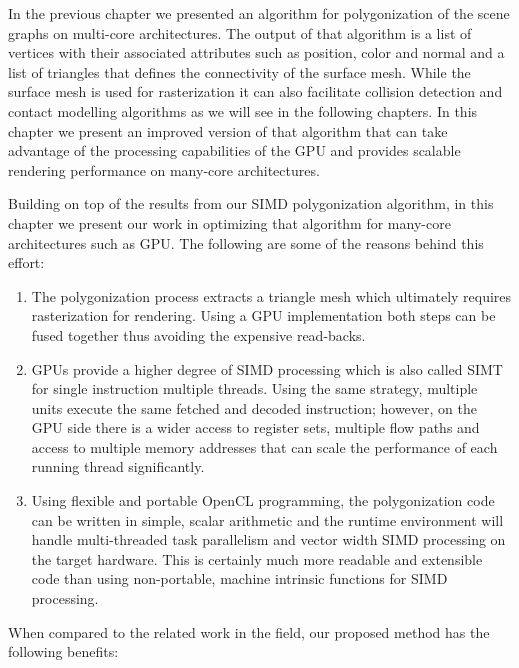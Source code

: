 \label{chapter:GPUDiscretization}
In the previous chapter we presented an algorithm for polygonization of the \blob scene graphs on 
multi-core architectures. The output of that algorithm is a list of vertices with their associated attributes 
such as position, color and normal and a list of triangles that defines the connectivity of the surface mesh. 
While the surface mesh is used for rasterization it can also facilitate collision detection and contact 
modelling algorithms as we will see in the following chapters.  In this chapter we present an improved 
version of that algorithm that can take advantage of the processing capabilities of the GPU and provides 
scalable rendering performance on many-core architectures. 


Building on top of the results from our SIMD polygonization algorithm, in this chapter we present our 
work in optimizing that algorithm for many-core architectures such as GPU. The following are some of 
the reasons behind this effort:

\begin{enumerate}
 \item The polygonization process extracts a triangle mesh which ultimately requires rasterization for 
 rendering. Using a GPU implementation both steps can be fused together thus avoiding the expensive 
 read-backs. 

 \item GPUs provide a higher degree of SIMD processing which is also called SIMT for single instruction
 multiple threads. Using the same strategy, multiple units execute the same 
 fetched and decoded instruction; however, on the GPU side there is a wider access to 
 register sets, multiple flow paths and access to multiple memory addresses that can scale the 
 performance of each running thread significantly. 
  
 \item Using flexible and portable OpenCL programming, the polygonization code can be written 
 in simple, scalar arithmetic and the runtime environment will handle multi-threaded task 
 parallelism and vector width SIMD processing on the target hardware. This 
 is certainly much more readable and extensible code than using non-portable, machine 
 intrinsic functions for SIMD processing.
 
 
\end{enumerate}


When compared to the related work in the field, our proposed method has the following benefits:

